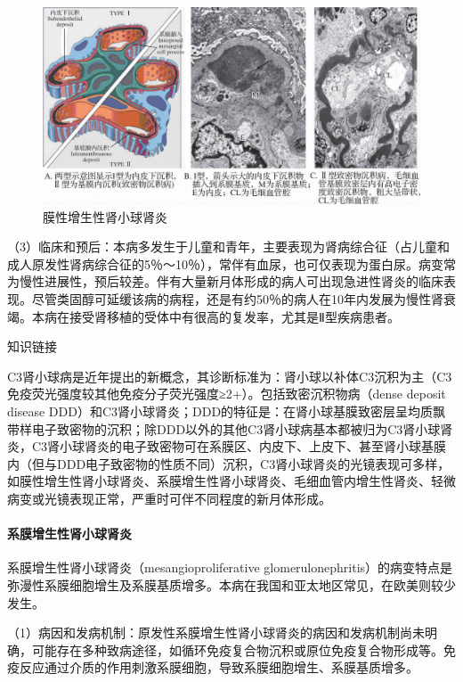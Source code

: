 \begin{figure}[!htbp]
 \centering
 \includegraphics{./images/Image00169.jpg}
 \captionsetup{justification=centering}
 \caption{膜性增生性肾小球肾炎}
 \label{fig10-21}
  \end{figure} 

（3）临床和预后：本病多发生于儿童和青年，主要表现为肾病综合征（占儿童和成人原发性肾病综合征的5％～10％），常伴有血尿，也可仅表现为蛋白尿。病变常为慢性进展性，预后较差。伴有大量新月体形成的病人可出现急进性肾炎的临床表现。尽管类固醇可延缓该病的病程，还是有约50％的病人在10年内发展为慢性肾衰竭。本病在接受肾移植的受体中有很高的复发率，尤其是Ⅱ型疾病患者。

{知识链接}

C3肾小球病是近年提出的新概念，其诊断标准为：肾小球以补体C3沉积为主（C3免疫荧光强度较其他免疫分子荧光强度≥2+）。包括致密沉积物病（dense
deposit disease
DDD）和C3肾小球肾炎；DDD的特征是：在肾小球基膜致密层呈均质飘带样电子致密物的沉积；除DDD以外的其他C3肾小球病基本都被归为C3肾小球肾炎，C3肾小球肾炎的电子致密物可在系膜区、内皮下、上皮下、甚至肾小球基膜内（但与DDD电子致密物的性质不同）沉积，C3肾小球肾炎的光镜表现可多样，如膜性增生性肾小球肾炎、系膜增生性肾小球肾炎、毛细血管内增生性肾炎、轻微病变或光镜表现正常，严重时可伴不同程度的新月体形成。

\paragraph{系膜增生性肾小球肾炎}
系膜增生性肾小球肾炎（mesangioproliferative
glomerulonephritis）的病变特点是弥漫性系膜细胞增生及系膜基质增多。本病在我国和亚太地区常见，在欧美则较少发生。

（1）病因和发病机制：原发性系膜增生性肾小球肾炎的病因和发病机制尚未明确，可能存在多种致病途径，如循环免疫复合物沉积或原位免疫复合物形成等。免疫反应通过介质的作用刺激系膜细胞，导致系膜细胞增生、系膜基质增多。

